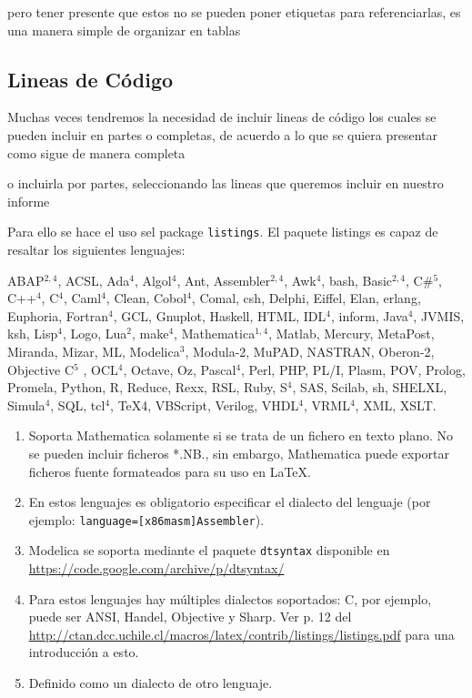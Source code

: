 \documentclass[a4paper]{IEEEtran} %
\begin{document}
pero tener presente que estos no se pueden poner etiquetas para referenciarlas, es una manera simple de organizar en tablas

\subsection{Lineas de Código}

Muchas veces tendremos la necesidad de incluir lineas de código los cuales se pueden incluir en partes o completas, de acuerdo a lo que se quiera presentar como sigue de manera completa



o incluirla por partes, seleccionando las lineas que queremos incluir en nuestro informe



Para ello se hace el uso sel package \texttt{listings}. El paquete listings es capaz de resaltar los siguientes lenguajes:

ABAP$^{2,4}$, ACSL, Ada$^4$, Algol$^4$, Ant, Assembler$^{2,4}$, Awk$^4$, bash, Basic$^{2,4}$, C\#$^{5}$, C++$^4$, C$^4$, Caml$^4$, Clean, Cobol$^4$, Comal, csh, Delphi, Eiffel, Elan, erlang, Euphoria, Fortran$^4$, GCL, Gnuplot, Haskell, HTML, IDL$^4$, inform, Java$^4$, JVMIS, ksh, Lisp$^4$, Logo, Lua$^2$, make$^4$, Mathematica$^{1,4}$, Matlab, Mercury, MetaPost, Miranda, Mizar, ML, Modelica$^3$, Modula-2, MuPAD, NASTRAN, Oberon-2, Objective C$^5$ , OCL$^4$, Octave, Oz, Pascal$^4$, Perl, PHP, PL/I, Plasm, POV, Prolog, Promela, Python, R, Reduce, Rexx, RSL, Ruby, S$^4$, SAS, Scilab, sh, SHELXL, Simula$^4$, SQL, tcl$^4$, TeX4, VBScript, Verilog, VHDL$^4$, VRML$^4$, XML, XSLT.

\begin{enumerate}
\item Soporta Mathematica solamente si se trata de un fichero en texto plano. No se pueden incluir ficheros *.NB., sin embargo, Mathematica puede exportar ficheros fuente formateados para su uso en \LaTeX.
\item En estos lenguajes es obligatorio especificar el dialecto del lenguaje (por ejemplo: \texttt{language={[x86masm]Assembler}}).
\item Modelica se soporta mediante el paquete \texttt{dtsyntax} disponible en \url{https://code.google.com/archive/p/dtsyntax/}
\item Para estos lenguajes hay múltiples dialectos soportados: C, por ejemplo, puede ser ANSI, Handel, Objective y Sharp. Ver p. 12 del \url{http://ctan.dcc.uchile.cl/macros/latex/contrib/listings/listings.pdf} para una introducción a esto.
\item Definido como un dialecto de otro lenguaje.
\end{enumerate}
\end{document}

